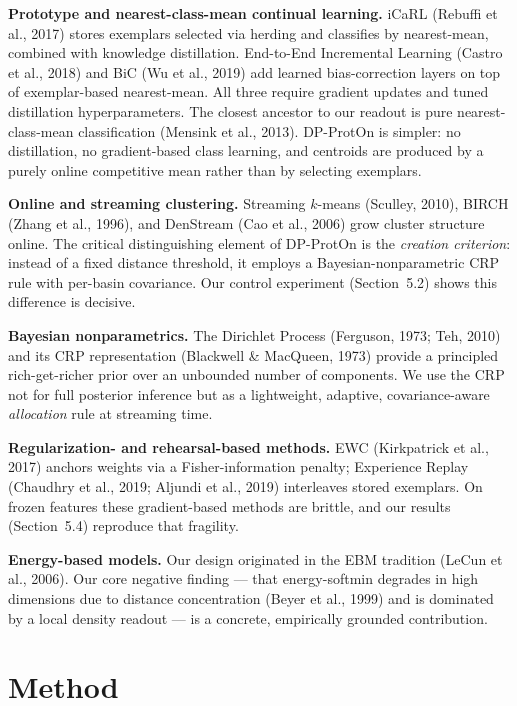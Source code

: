\documentclass[11pt,a4paper]{article}
\begin{document}
\textbf{Prototype and nearest-class-mean continual learning.} iCaRL (Rebuffi et al., 2017) stores exemplars selected via herding and classifies by nearest-mean, combined with knowledge distillation. End-to-End Incremental Learning (Castro et al., 2018) and BiC (Wu et al., 2019) add learned bias-correction layers on top of exemplar-based nearest-mean. All three require gradient updates and tuned distillation hyperparameters. The closest ancestor to our readout is pure nearest-class-mean classification (Mensink et al., 2013). DP-ProtOn is simpler: no distillation, no gradient-based class learning, and centroids are produced by a purely online competitive mean rather than by selecting exemplars.

\textbf{Online and streaming clustering.} Streaming $k$-means (Sculley, 2010), BIRCH (Zhang et al., 1996), and DenStream (Cao et al., 2006) grow cluster structure online. The critical distinguishing element of DP-ProtOn is the \textit{creation criterion}: instead of a fixed distance threshold, it employs a Bayesian-nonparametric CRP rule with per-basin covariance. Our control experiment (Section~5.2) shows this difference is decisive.

\textbf{Bayesian nonparametrics.} The Dirichlet Process (Ferguson, 1973; Teh, 2010) and its CRP representation (Blackwell \& MacQueen, 1973) provide a principled rich-get-richer prior over an unbounded number of components. We use the CRP not for full posterior inference but as a lightweight, adaptive, covariance-aware \textit{allocation} rule at streaming time.

\textbf{Regularization- and rehearsal-based methods.} EWC (Kirkpatrick et al., 2017) anchors weights via a Fisher-information penalty; Experience Replay (Chaudhry et al., 2019; Aljundi et al., 2019) interleaves stored exemplars. On frozen features these gradient-based methods are brittle, and our results (Section~5.4) reproduce that fragility.

\textbf{Energy-based models.} Our design originated in the EBM tradition (LeCun et al., 2006). Our core negative finding — that energy-softmin degrades in high dimensions due to distance concentration (Beyer et al., 1999) and is dominated by a local density readout — is a concrete, empirically grounded contribution.

\section{Method}
\end{document}
